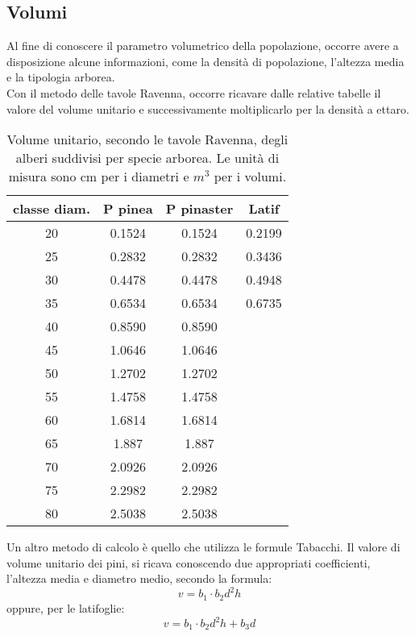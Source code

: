 \subsection{Volumi}
Al fine di conoscere il parametro volumetrico della popolazione, occorre avere a disposizione alcune informazioni, come la densità di popolazione, l'altezza media e la tipologia arborea.\\
Con il metodo delle tavole Ravenna, occorre ricavare dalle relative tabelle il valore del volume unitario e successivamente moltiplicarlo per la densità a ettaro.
\begin{table}[H]
\caption{Volume unitario, secondo le tavole Ravenna, degli alberi suddivisi per specie arborea. Le unità di misura sono cm per i diametri e $m^3$ per i volumi.}
\centering
\begin{tabular}{cccc}
\toprule
classe diam. & P pinea & P pinaster & Latif  \\
\midrule
20 & 0.1524  & 0.1524     & 0.2199 \\
25 & 0.2832  & 0.2832     & 0.3436 \\
30 & 0.4478  & 0.4478     & 0.4948 \\
35 & 0.6534  & 0.6534     & 0.6735 \\
40 & 0.8590  & 0.8590     &        \\
45 & 1.0646  & 1.0646     &        \\
50 & 1.2702  & 1.2702     &        \\
55 & 1.4758  & 1.4758     &        \\
60 & 1.6814  & 1.6814     &        \\
65 & 1.887   & 1.887      &        \\
70 & 2.0926  & 2.0926     &        \\
75 & 2.2982  & 2.2982     &        \\
80 & 2.5038  & 2.5038     &        \\
\bottomrule
\end{tabular}
\label{table:volume_ravenna_ovest}
\end{table}
Un altro metodo di calcolo è quello che utilizza le formule Tabacchi. Il valore di volume unitario dei pini, si ricava conoscendo due appropriati coefficienti, l'altezza media e diametro medio, secondo la formula: 
\begin{equation}
    v = b_1 \cdot b_2 d^2 h \label{Formula_tabacchi}
\end{equation}
oppure, per le latifoglie:
\begin{equation}
    v = b_1 \cdot b_2 d^2 h + b_3 d
\end{equation}

